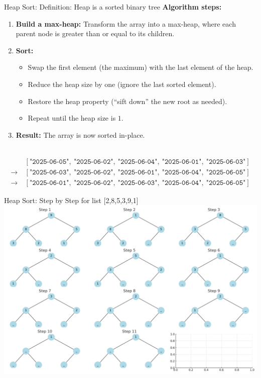 \documentclass[aspectratio=169]{beamer}
\begin{document}
\begin{frame}{Heap Sort:}
  Definition: Heap is a sorted binary tree
  \textbf{Algorithm steps:}
  \begin{enumerate}
    \item \textbf{Build a max-heap:}
      Transform the array into a max-heap, where each parent node is greater than or equal to its children.
    \item \textbf{Sort:}
      \begin{itemize}
        \item Swap the first element (the maximum) with the last element of the heap.
        \item Reduce the heap size by one (ignore the last sorted element).
        \item Restore the heap property (“sift down” the new root as needed).
        \item Repeat until the heap size is $1$.
      \end{itemize}
    \item \textbf{Result:} The array is now sorted in-place.
  \end{enumerate}\\

  \[
  \begin{aligned}
    &[\texttt{"2025-06-05"},\ \texttt{"2025-06-02"},\ \texttt{"2025-06-04"},\ \texttt{"2025-06-01"},\ \texttt{"2025-06-03"}]\\
    \to\ &[ \texttt{"2025-06-03"},\ \texttt{"2025-06-02"},\ \texttt{"2025-06-01"},\ \texttt{"2025-06-04"},\ \texttt{"2025-06-05"}]\\
    \to\ &[ \texttt{"2025-06-01"},\ \texttt{"2025-06-02"},\ \texttt{"2025-06-03"},\ \texttt{"2025-06-04"},\ \texttt{"2025-06-05"}]
  \end{aligned}
\]
\end{frame}

\begin{frame}{Heap Sort: Step by Step for list [2,8,5,3,9,1]}
  \hspace*{-2cm}
\includegraphics[width=1.1\linewidth]{graphs/heap_sort_steps.png}
\end{frame}
\end{document}
